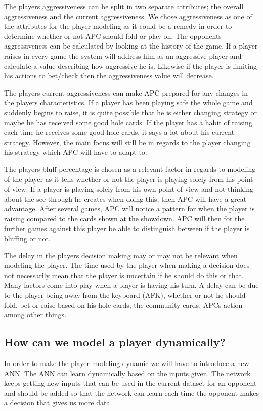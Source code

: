 The players aggressiveness can be split in two separate attributes; the overall aggressiveness and the current aggressiveness. We chose aggressiveness as one of the attributes for the player modeling as it could be a remedy in order to determine whether or not APC should fold or play on.
The opponents aggressiveness can be calculated by looking at the history of the game. If a player raises in every game the system will address him as an aggressive player and calculate a value describing how aggressive he is. Likewise if the player is limiting his actions to bet/check then the aggressiveness value will decrease. 

The players current aggressiveness can make APC prepared for any changes in the players characteristics. If a player has been playing safe the whole game and suddenly begins to raise, it is quite possible that he is either changing strategy or maybe he has received some good hole cards. If the player has a habit of raising each time he receives some good hole cards, it says a lot about his current strategy. However, the main focus will still be in regards to the player changing his strategy which APC will have to adapt to.

The players bluff percentage is chosen as a relevant factor in regards to modeling of the player as it tells whether or not the player is playing solely from his point of view. If a player is playing solely from his own point of view and not thinking about the see-through he creates when doing this, then APC will have a great advantage. After several games, APC will notice a pattern for when the player is raising compared to the cards shown at the showdown. APC will then for the further games against this player be able to distinguish between if the player is bluffing or not.


The delay in the players decision making may or may not be relevant when modeling the player. The time used by the player when making a decision does not necessarily mean that the player is uncertain if he should do this or that. Many factors come into play when a player is having his turn. A delay can be due to the player being away from the keyboard (AFK), whether or not he should fold, bet or raise based on his hole cards, the community cards, APCs action among other things. 
\\

\subsection{How can we model a player dynamically?}
In order to make the player modeling dynamic we will have to introduce a new ANN. The ANN can learn dynamically based on the inputs given. The network keeps getting new inputs that can be used in the current dataset for an opponent and should be added so that the network can learn each time the opponent makes a decision that gives us more data.

